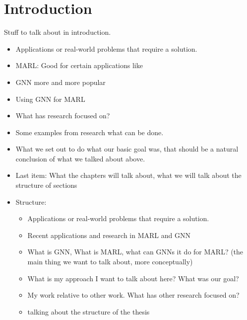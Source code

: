 
\chapter{Introduction}
Stuff to talk about in introduction.
\begin{itemize}[noitemsep,nolistsep]
	\item Applications or real-world problems that require a solution. 
	\item MARL: Good for certain applications like
	\item GNN more and more popular
	\item Using GNN for MARL
	\item What has research focused on?
	\item Some examples from research what can be done.
	\item What we set out to do what our basic goal was, that should be a natural conclusion of what we talked about above.
	\item Last item: What the chapters will talk about, what we will talk about the structure of sections
	\item Structure:
	\begin{itemize}[noitemsep,nolistsep]
		\item Applications or real-world problems that require a solution. 
		\item Recent applications and research in MARL and GNN
		\item What is GNN, What is MARL, what can GNNs it do for MARL? (the main thing we want to talk about, more conceptually)
		\item What is my approach I want to talk about here? What was our goal?
		\item My work relative to other work. What has other research focused on?
		\item talking about the structure of the thesis
	\end{itemize}
\end{itemize}